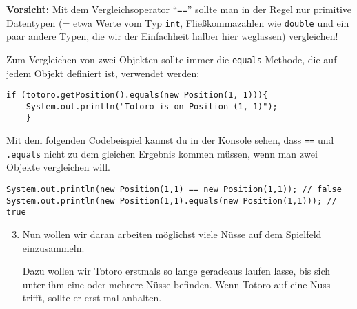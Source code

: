 \begin{Infobox}[\lstinline{==} und die \lstinline{equals()}-Methode]
	\textbf{Vorsicht:} Mit dem Vergleichsoperator \enquote{\lstinline{==}} sollte man in der Regel nur primitive Datentypen (= etwa Werte vom Typ \lstinline{int}, Fließkommazahlen wie \lstinline{double} und ein paar andere Typen, die wir der Einfachheit halber hier weglassen) vergleichen!\newline

	Zum Vergleichen von zwei Objekten sollte immer die \lstinline{equals}-Methode, die auf jedem Objekt definiert ist, verwendet werden:

	\begin{lstlisting}[numbers=none]
	if (totoro.getPosition().equals(new Position(1, 1))){
	System.out.println("Totoro is on Position (1, 1)");
	}
	\end{lstlisting}
	
	Mit dem folgenden Codebeispiel kannst du in der Konsole sehen, dass \lstinline{==} und \lstinline{.equals} nicht zu dem gleichen Ergebnis kommen müssen, wenn man zwei Objekte vergleichen will.

	\begin{lstlisting}[numbers=none]
System.out.println(new Position(1,1) == new Position(1,1)); // false
System.out.println(new Position(1,1).equals(new Position(1,1))); // true
	\end{lstlisting}

\end{Infobox}


\begin{enumerate}\setcounter{enumi}{2}
	\item
	 	Nun wollen wir daran arbeiten möglichst viele Nüsse auf dem Spielfeld einzusammeln.

		Dazu wollen wir Totoro erstmals so lange geradeaus laufen lasse, bis sich unter ihm eine oder mehrere Nüsse befinden.
		Wenn Totoro auf eine Nuss trifft, sollte er erst mal anhalten.
\end{enumerate}


